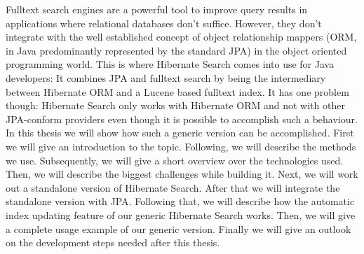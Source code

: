 Fulltext search engines are a powerful tool to improve query results in applications where relational databases don't suffice. However, they don't integrate with the well established concept of object relationship mappers (ORM, in Java predominantly represented by the standard JPA) in the object oriented programming world. This is where Hibernate Search comes into use for Java developers: It combines JPA and fulltext search by being the intermediary between Hibernate ORM and a Lucene based fulltext index. It has one problem though: Hibernate Search only works with Hibernate ORM and not with other JPA-conform providers even though it is possible to accomplish such a behaviour. In this thesis we will show how such a generic version can be accomplished. First we will give an introduction to the topic. Following, we will describe the methods we use. Subsequently, we will give a short overview over the technologies used. Then, we will describe the biggest challenges while building it. Next, we will work out a standalone version of Hibernate Search. After that we will integrate the standalone version with JPA. Following that, we will describe how the automatic index updating feature of our generic Hibernate Search works. Then, we will give a complete usage example of our generic version. Finally we will give an outlook on the development steps needed after this thesis.
